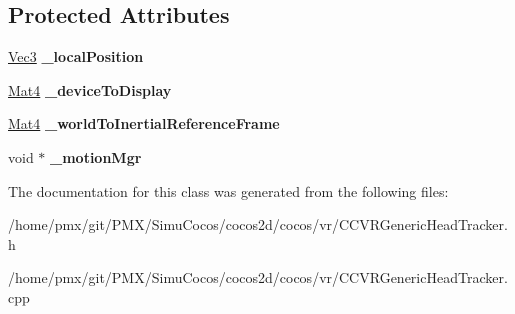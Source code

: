 \subsection*{Protected Attributes}
\begin{DoxyCompactItemize}
\item 
\mbox{\label{classVRGenericHeadTracker_ad8d5b28d7e24d97900f91ac17028dc31}} 
\hyperlink{classVec3}{Vec3} {\bfseries \+\_\+local\+Position}
\item 
\mbox{\label{classVRGenericHeadTracker_a36edb3aa10abc7b720ae1ff4a08d306d}} 
\hyperlink{classMat4}{Mat4} {\bfseries \+\_\+device\+To\+Display}
\item 
\mbox{\label{classVRGenericHeadTracker_a9211779acc9950e4ee1253458d251626}} 
\hyperlink{classMat4}{Mat4} {\bfseries \+\_\+world\+To\+Inertial\+Reference\+Frame}
\item 
\mbox{\label{classVRGenericHeadTracker_a020693c3d0f1a057d4fdadc9868701d4}} 
void $\ast$ {\bfseries \+\_\+motion\+Mgr}
\end{DoxyCompactItemize}


The documentation for this class was generated from the following files\+:\begin{DoxyCompactItemize}
\item 
/home/pmx/git/\+P\+M\+X/\+Simu\+Cocos/cocos2d/cocos/vr/C\+C\+V\+R\+Generic\+Head\+Tracker.\+h\item 
/home/pmx/git/\+P\+M\+X/\+Simu\+Cocos/cocos2d/cocos/vr/C\+C\+V\+R\+Generic\+Head\+Tracker.\+cpp\end{DoxyCompactItemize}
